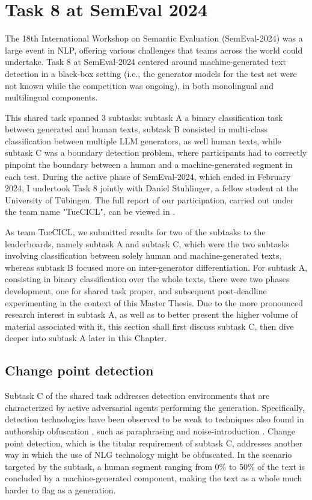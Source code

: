 \section{Task 8 at SemEval 2024}
\label{sec:task}

The 18th International Workshop on Semantic Evaluation (SemEval-2024) was a large event in NLP, offering various challenges that teams across the world could undertake.
Task 8 at SemEval-2024 \citep{wang2024semeval} centered around machine-generated text detection in a black-box setting (i.e., the generator models for the test set were not known while the competition was ongoing), in both monolingual and multilingual components.

This shared task spanned 3 subtasks: subtask A a binary classification task between generated and human texts, subtask B consisted in multi-class classification between multiple LLM generators, as well human texts, while subtask C was a boundary detection problem, where participants had to correctly pinpoint the boundary between a human and a machine-generated segment in each test.
During the active phase of SemEval-2024, which ended in February 2024, I undertook Task 8 jointly with Daniel Stuhlinger, a fellow student at the University of Tübingen.
The full report of our participation, carried out under the team name "TueCICL", can be viewed in \citet{stuhlinger-winkler-2024-tuecicl}.

As team TueCICL, we submitted results for two of the subtasks to the leaderboards, namely subtask A and subtask C, which were the two subtasks involving classification between solely human and machine-generated texts, whereas subtask B focused more on inter-generator differentiation.
For subtask A, consisting in binary classification over the whole texts, there were two phases development, one for shared task proper, and subsequent post-deadline experimenting in the context of this Master Thesis.
Due to the more pronounced research interest in subtask A, as well as to better present the higher volume of material associated with it, this section shall first discuss subtask C, then dive deeper into subtask A later in this Chapter.

\subsection{Change point detection}

Subtask C of the shared task addresses detection environments that are characterized by active adversarial agents performing the generation.
Specifically, detection technologies have been observed to be weak to techniques also found in authorship obfuscation \citep{macko2024authorship}, such as paraphrasing \citep{krishna2024paraphrasing} and noise-introduction \citep{wang2021adversarial}.
Change point detection, which is the titular requirement of subtask C, addresses another way in which the use of NLG technology might be obfuscated.
In the scenario targeted by the subtask, a human segment ranging from 0\% to 50\% of the text is concluded by a machine-generated component, making the text as a whole much harder to flag as a generation.

